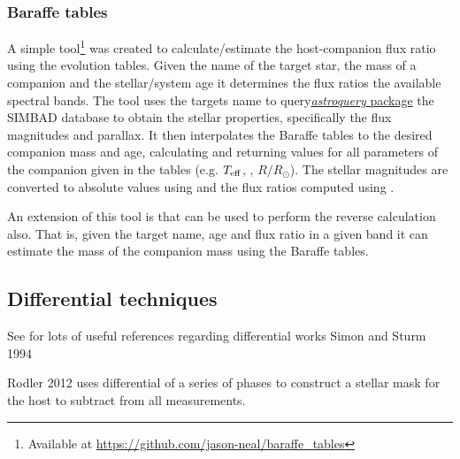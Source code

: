 \subsubsection{Baraffe tables}
\label{subsubsec:baraffe_tables_code}
A simple tool\footnote{Available at \url{https://github.com/jason-neal/baraffe_tables}} was created to calculate/estimate the host-companion flux ratio using the \citet{baraffe_evolutionary_2003,baraffe_new_2015} evolution tables.
Given the name of the target star, the mass of a companion and the stellar/system age it determines the flux ratios the available spectral bands.
The tool uses the targets name to query\href{https://zenodo.org/record/1160627}{\emph{astroquery} package} the {SIMBAD} database to obtain the stellar properties, specifically the flux magnitudes and parallax. It then interpolates the Baraffe tables to the desired companion mass and age, calculating and returning values for all parameters of the companion given in the tables (e.g. \(T_{\mathrm{eff}}\), \logg, \(R/R_{\odot}\)).
The stellar magnitudes are converted to absolute values using  and the flux ratios computed using  .

An extension of this tool is that can be used to perform the reverse calculation also. That is, given the target name, age and flux ratio in a given band it can estimate the mass of the companion mass using the Baraffe tables.










\subsection{Differential techniques}
See \citet{kostov... 2013} for lots of useful references regarding differential works Simon and Sturm 1994

Rodler 2012 uses differential of a series of phases to construct a stellar mask for the host to subtract from all measurements.
